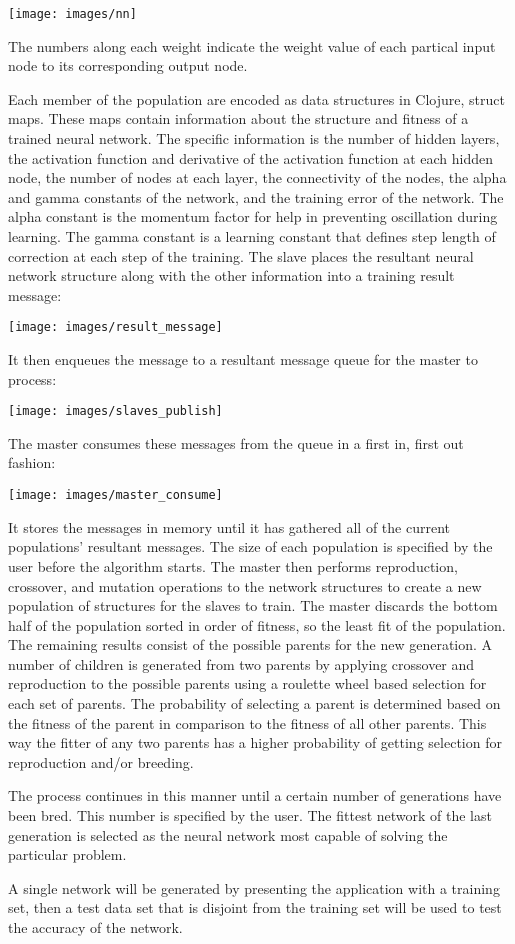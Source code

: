 \texttt{[image: images/nn]}

The numbers along each weight indicate the weight value of each partical input node to its corresponding output node. 

Each member of the population are encoded as data structures in Clojure, struct maps. 
These maps contain information about the structure and fitness of a trained neural network. 
The specific information is the number of hidden layers, the activation function and derivative of the activation function at each hidden node, the number of nodes at each layer, the connectivity of the nodes, the alpha and gamma constants of the network, and the training error of the network. 
The alpha constant is the momentum factor for help in preventing oscillation during learning. 
The gamma constant is a learning constant that defines step length of correction at each step of the training.
The slave places the resultant neural network structure along with the other information into a training result message:

\texttt{[image: images/result\_message]}

It then enqueues the message to a resultant message queue for the master to process:

\texttt{[image: images/slaves\_publish]} 

The master consumes these messages from the queue in a first in, first out fashion:

\texttt{[image: images/master\_consume]} 

It stores the messages in memory until it has gathered all of the current populations' resultant messages. 
The size of each population is specified by the user before the algorithm starts.
The master then performs reproduction, crossover, and mutation operations to the network structures to create a new population of structures for the slaves to train.
The master discards the bottom half of the population sorted in order of fitness, so the least fit of the population. 
The remaining results consist of the possible parents for the new generation. 
A number of children is generated from two parents by applying crossover and reproduction to the possible parents using a roulette wheel based selection for each set of parents. 
The probability of selecting a parent is determined based on the fitness of the parent in comparison to the fitness of all other parents. 
This way the fitter of any two parents has a higher probability of getting selection for reproduction and/or breeding.

The process continues in this manner until a certain number of generations have been bred. 
This number is specified by the user. 
The fittest network of the last generation is selected as the neural network most capable of solving the particular problem.  

A single network will be generated by presenting the application with a training set, then a test data set that is disjoint from the training set will be used to test the accuracy of the network.
